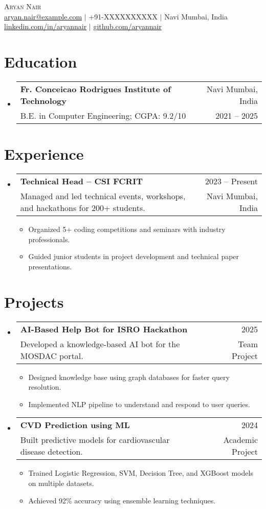 \documentclass[a4paper,11pt]{article}
\makeatletter
\newcommand{\resumeItem}[1]{
  \item{\small{#1}}
}
\newcommand{\resumeSubheading}[4]{
  \vspace{2pt}\item
    \begin{tabular*}{0.97\textwidth}{l@{\extracolsep{\fill}}r}
      \textbf{#1} & #2 \\
      {\small#3} & {\small #4} \\
    \end{tabular*}\vspace{-2pt}
}
\newcommand{\resumeSubHeadingListStart}{\begin{itemize}[leftmargin=0.15in, label={}]}
\newcommand{\resumeSubHeadingListEnd}{\end{itemize}}
\newcommand{\resumeItemListStart}{\begin{itemize}[leftmargin=0.2in, label={--}, itemsep=1pt, parsep=0pt]}
\newcommand{\resumeItemListEnd}{\end{itemize}\vspace{-2pt}}
\makeatother
\begin{document}
\begin{center}
    {\Huge \scshape Aryan Nair} \\ \vspace{2pt}
    \href{mailto:aryan.nair@example.com}{aryan.nair@example.com} $|$ +91-XXXXXXXXXX $|$ Navi Mumbai, India \\ \vspace{2pt}
    \href{https://linkedin.com/in/aryannair}{linkedin.com/in/aryannair} $|$ \href{https://github.com/aryannair}{github.com/aryannair}
\end{center}

\section{Education}
  \resumeSubHeadingListStart
    \resumeSubheading
      {Fr. Conceicao Rodrigues Institute of Technology}{Navi Mumbai, India}
      {B.E. in Computer Engineering;  CGPA: 9.2/10}{2021 -- 2025}
  \resumeSubHeadingListEnd

\section{Experience}
  \resumeSubHeadingListStart
    \resumeSubheading
      {Technical Head -- CSI FCRIT}{2023 -- Present}
      {Managed and led technical events, workshops, and hackathons for 200+ students.}{Navi Mumbai, India}
      \resumeItemListStart
        \resumeItem{Organized 5+ coding competitions and seminars with industry professionals.}
        \resumeItem{Guided junior students in project development and technical paper presentations.}
      \resumeItemListEnd
  \resumeSubHeadingListEnd

\section{Projects}
  \resumeSubHeadingListStart
    \resumeSubheading
      {AI-Based Help Bot for ISRO Hackathon}{2025}
      {Developed a knowledge-based AI bot for the MOSDAC portal.}{Team Project}
      \resumeItemListStart
        \resumeItem{Designed knowledge base using graph databases for faster query resolution.}
        \resumeItem{Implemented NLP pipeline to understand and respond to user queries.}
      \resumeItemListEnd

    \resumeSubheading
      {CVD Prediction using ML}{2024}
      {Built predictive models for cardiovascular disease detection.}{Academic Project}
      \resumeItemListStart
        \resumeItem{Trained Logistic Regression, SVM, Decision Tree, and XGBoost models on multiple datasets.}
        \resumeItem{Achieved 92\% accuracy using ensemble learning techniques.}
      \resumeItemListEnd
  \resumeSubHeadingListEnd
\end{document}
